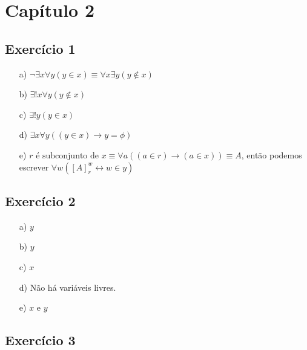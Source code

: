 \documentclass{article}
\begin{document}
\section*{Capítulo 2}

\subsection*{Exercício 1}

\begin{enumerate}
    \item[a)] $\neg \exists x \forall y (y \in x) \equiv \forall x \exists y (y \notin x)$
    \item[b)] $\exists ! x \forall y (y \notin x)$
    \item[c)] $\exists ! y (y \in x)$
    \item[d)] $\exists x \forall y ((y \in x) \rightarrow y = \phi)$
    \item[e)] $r \text{ é subconjunto de } x \equiv \forall a ((a \in r) \rightarrow (a \in x)) \equiv A$, então podemos escrever $\forall w ([A]_r^w \leftrightarrow w \in y)$
\end{enumerate}

\subsection*{Exercício 2}

\begin{enumerate}
    \item[a)] $y$
    \item[b)] $y$
    \item[c)] $x$
    \item[d)] Não há variáveis livres.
    \item[e)] $x$ e $y$
 \end{enumerate}
 
\subsection*{Exercício 3}
\end{document}
